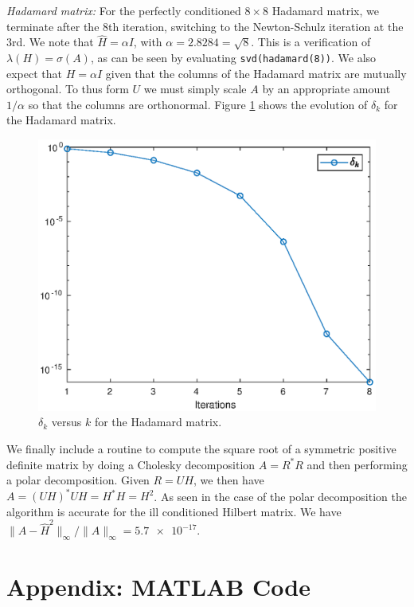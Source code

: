 \documentclass[12pt]{article}
\def\normo#1{\|#1\|_{\infty}}
\begin{document}
\textit{Hadamard matrix:} For the perfectly conditioned $8\times 8$ Hadamard
matrix, we terminate after the $8$th iteration, switching to the Newton-Schulz
iteration at the $3$rd. We note that $\hat{H} = \alpha I$, with
$\alpha = 2.8284 = \sqrt{8}$.  This is a verification of
$\lambda(H) = \sigma(A)$, as can be seen by evaluating
\texttt{svd(hadamard(8))}. We also expect that $H = \alpha I$ given that the
columns of the Hadamard matrix are mutually orthogonal. To thus form $U$ we must
simply scale $A$ by an appropriate amount $1/\alpha$ so that the columns are
orthonormal. Figure \ref{fig:hadamard} shows the evolution of $\delta_k$ for the
Hadamard matrix.
\begin{figure}
  \centering
  \includegraphics[scale=0.8]{hadamard}
  \caption{$\delta_k$ versus $k$ for the Hadamard matrix.}
  \label{fig:hadamard}    
\end{figure}

We finally include a routine to compute the square root of a symmetric positive
definite matrix by doing a Cholesky decomposition $A = R^*R$ and then performing
a polar decomposition.
Given $R = UH$, we then have $A = (UH)^*UH = H^*H = H^2$.
As seen in the case of the polar decomposition the algorithm is accurate for the
ill conditioned Hilbert matrix.
We have $\normo{A - \hat{H}^2}/\normo{A} = \num{5.7e-17}$.

\section*{Appendix: MATLAB Code}





\end{document}
